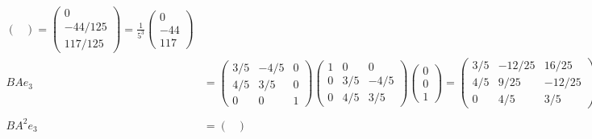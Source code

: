 \documentclass[12pt]{article}
\begin{document}
\begin{align*}
\begin{pmatrix}
            \end{pmatrix} = \begin{pmatrix}
                0\\-44/125\\117/125
            \end{pmatrix} = \frac{1}{5^3} \begin{pmatrix}
                0\\-44\\117
            \end{pmatrix}\\ 
            BAe_3 &= \begin{pmatrix}
                3/5 & -4/5 & 0\\ 
                4/5 & 3/5 & 0\\
                0 & 0 & 1
            \end{pmatrix} \begin{pmatrix}
                1 & 0 & 0\\ 
                0 & 3/5 & -4/5\\
                0 & 4/5 & 3/5
            \end{pmatrix}\begin{pmatrix}
                0\\0\\1
            \end{pmatrix} = \begin{pmatrix}
                3/5 & -12/25 & 16/25\\ 
                4/5 & 9/25 & -12/25\\
                0 & 4/5 & 3/5
            \end{pmatrix}\begin{pmatrix}
                0\\0\\1
            \end{pmatrix} = \begin{pmatrix}
                16/25\\-12/25\\3/5
            \end{pmatrix} = \frac{1}{5^2} \begin{pmatrix}
                16\\-12\\15
            \end{pmatrix}\\ \\
            BA^2e_3 &= \begin{pmatrix}

\end{pmatrix}
\end{align*}
\end{document}
